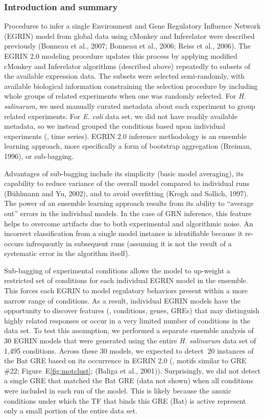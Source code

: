 \subsubsection{Introduction and summary}

Procedures to infer a single Environment and Gene Regulatory Influence
Network (EGRIN) model from global data using cMonkey and Inferelator
were described previously (Bonneau et al., 2007; Bonneau et al., 2006;
Reiss et al., 2006). The EGRIN 2.0 modeling procedure updates this
process by applying modified cMonkey and Inferelator algorithms
(described above) repeatedly to subsets of the available expression
data. The subsets were selected semi-randomly, with available
biological information constraining the selection procedure by
including whole groups of related experiments when one was randomly
selected. For {\it H. salinarum}, we used manually curated metadata about
each experiment to group related experiments. For {\it E. coli} data set, we
did not have readily available metadata, so we instead grouped the
conditions based upon individual experiments (\eg, time series).
EGRIN 2.0 inference methodology is an ensemble learning approach, more
specifically a form of bootstrap aggregation (Breiman, 1996), or
sub-bagging.

Advantages of sub-bagging include its simplicity (basic model
averaging), its capability to reduce variance of the overall model
compared to individual runs (Bühlmann and Yu, 2002), and to avoid
overfitting (Krogh and Sollich, 1997). The power of an ensemble
learning approach results from its ability to “average out” errors in
the individual models. In the case of GRN inference, this feature
helps to overcome artifacts due to both experimental and algorithmic
noise. An incorrect classification from a single model instance is
identifiable because it re-occurs infrequently in subsequent runs
(assuming it is not the result of a systematic error in the algorithm
itself).

Sub-bagging of experimental conditions allows the model to up-weight a
restricted set of conditions for each individual EGRIN model in the
ensemble. This forces each EGRIN to model regulatory behaviors present
within a more narrow range of conditions. As a result, individual
EGRIN models have the opportunity to discover features (\eg,
conditions, genes, GREs) that may distinguish highly related responses
or occur in a very limited number of conditions in the data set. To
test this assumption, we performed a separate ensemble analysis of 30
EGRIN models that were generated using the entire {\it H. salinarum} data
set of 1,495 conditions. Across these 30 models, we expected to detect
$~20$ instances of the Bat GRE based on its occurrence in EGRIN 2.0
(\ie, motifs similar to GRE \#22; Figure~E\ref{fig:motclust}; (Baliga et al.,
2001)). Surprisingly, we did not detect a single GRE that matched the
Bat GRE (data not shown) when all conditions were included in each run
of the model. This is likely because the anoxic conditions under which
the TF that binds this GRE (Bat) is active represent only a small
portion of the entire data set.

